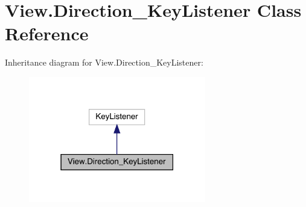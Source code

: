 \hypertarget{class_view_1_1_direction___key_listener}{}\section{View.\+Direction\+\_\+\+Key\+Listener Class Reference}
\label{class_view_1_1_direction___key_listener}


Inheritance diagram for View.\+Direction\+\_\+\+Key\+Listener\+:
\nopagebreak
\begin{figure}[H]
\begin{center}
\leavevmode
\includegraphics[width=219pt]{class_view_1_1_direction___key_listener__inherit__graph}
\end{center}
\end{figure}



